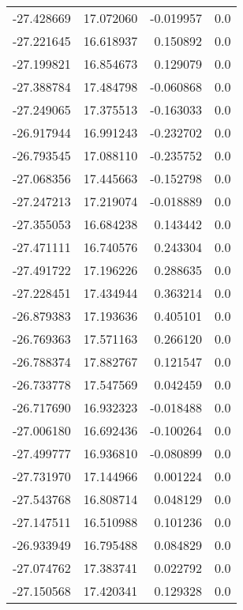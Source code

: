\begin{tabular}{rrrr}
      -27.428669 &        17.072060 &   -0.019957 &   0.0 \\
      -27.221645 &        16.618937 &    0.150892 &   0.0 \\
      -27.199821 &        16.854673 &    0.129079 &   0.0 \\
      -27.388784 &        17.484798 &   -0.060868 &   0.0 \\
      -27.249065 &        17.375513 &   -0.163033 &   0.0 \\
      -26.917944 &        16.991243 &   -0.232702 &   0.0 \\
      -26.793545 &        17.088110 &   -0.235752 &   0.0 \\
      -27.068356 &        17.445663 &   -0.152798 &   0.0 \\
      -27.247213 &        17.219074 &   -0.018889 &   0.0 \\
      -27.355053 &        16.684238 &    0.143442 &   0.0 \\
      -27.471111 &        16.740576 &    0.243304 &   0.0 \\
      -27.491722 &        17.196226 &    0.288635 &   0.0 \\
      -27.228451 &        17.434944 &    0.363214 &   0.0 \\
      -26.879383 &        17.193636 &    0.405101 &   0.0 \\
      -26.769363 &        17.571163 &    0.266120 &   0.0 \\
      -26.788374 &        17.882767 &    0.121547 &   0.0 \\
      -26.733778 &        17.547569 &    0.042459 &   0.0 \\
      -26.717690 &        16.932323 &   -0.018488 &   0.0 \\
      -27.006180 &        16.692436 &   -0.100264 &   0.0 \\
      -27.499777 &        16.936810 &   -0.080899 &   0.0 \\
      -27.731970 &        17.144966 &    0.001224 &   0.0 \\
      -27.543768 &        16.808714 &    0.048129 &   0.0 \\
      -27.147511 &        16.510988 &    0.101236 &   0.0 \\
      -26.933949 &        16.795488 &    0.084829 &   0.0 \\
      -27.074762 &        17.383741 &    0.022792 &   0.0 \\
      -27.150568 &        17.420341 &    0.129328 &   0.0 \\

\end{tabular}
